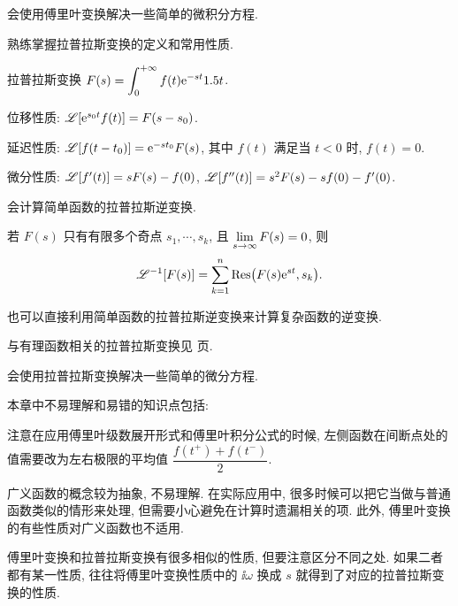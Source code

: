 \begin{conclusion}
\begin{conclusion}
  \end{conclusion}
  \item 会使用傅里叶变换解决一些简单的微积分方程.
  \item 熟练掌握拉普拉斯变换的定义和常用性质.
  \begin{conclusion}
    \item 拉普拉斯变换 $F(s)=\displaystyle\int_0^{+\infty} f(t)\mathrm{e}^{-st}1.5 t$.
    \item 位移性质: $\mathscr{L}[\mathrm{e}^{s_0 t}f(t)]=F(s-s_0)$.
    \item 延迟性质: $\mathscr{L}[f(t-t_0)]=\mathrm{e}^{-s t_0}F(s)$, 其中 $f(t)$ 满足当 $t<0$ 时, $f(t)=0$.
    \item 微分性质: $\mathscr{L}[f'(t)]=sF(s)-f(0)$, $\mathscr{L}[f''(t)]=s^2F(s)-sf(0)-f'(0)$.
  \end{conclusion}
  \item 会计算简单函数的拉普拉斯逆变换.
  \begin{conclusion}
    \item 若 $F(s)$ 只有有限多个奇点 $s_1,\cdots,s_k$, 且 $\lim\limits_{s\rightarrow\infty}F(s)=0$, 则
    \[
      \mathscr{L}^{-1}[F(s)]=\sum\limits_{k=1}^n {\mathrm{Res}}\bigl(F(s)\mathrm{e}^{st},s_k\bigr).
    \]
    \item 也可以直接利用简单函数的拉普拉斯逆变换来计算复杂函数的逆变换.
    \item 与有理函数相关的拉普拉斯变换见 \pageref{page:rational-laplace-transform} 页.
  \end{conclusion}
  \item 会使用拉普拉斯变换解决一些简单的微分方程.
\end{conclusion}

本章中不易理解和易错的知识点包括:
\begin{enuma}
  \item 注意在应用傅里叶级数展开形式和傅里叶积分公式的时候, 左侧函数在间断点处的值需要改为左右极限的平均值 $\dfrac{f(t^+)+f(t^-)}2$.
  \smallskip
  \item 广义函数的概念较为抽象, 不易理解. 在实际应用中, 很多时候可以把它当做与普通函数类似的情形来处理, 但需要小心避免在计算时遗漏相关的项. 此外, 傅里叶变换的有些性质对广义函数也不适用.
  \item 傅里叶变换和拉普拉斯变换有很多相似的性质, 但要注意区分不同之处. 如果二者都有某一性质, 往往将傅里叶变换性质中的 $\ii\omega$ 换成 $s$ 就得到了对应的拉普拉斯变换的性质.
\end{enuma}



